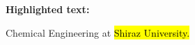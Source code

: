 \documentclass[12pt]{article}
\begin{document}
  
                  \begin{center}  
                     \textbf{\color{red} Highlighted text:} 
                  \end{center}  
                       Chemical Engineering at \hl{Shiraz University.}  
            
\end{document}
